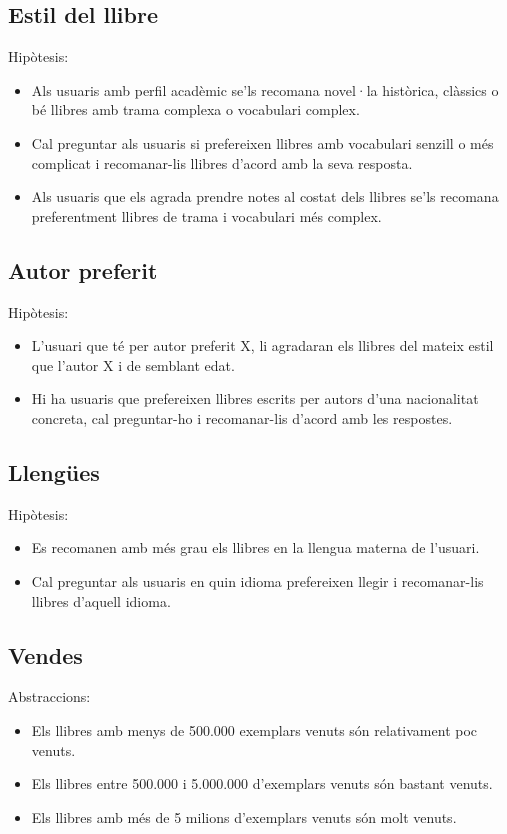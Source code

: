 \subsection{Estil del llibre}
Hipòtesis:
\begin{itemize}
  \item Als usuaris amb perfil acadèmic se'ls recomana novel·la històrica, clàssics o bé llibres amb trama complexa o vocabulari complex.
  \item Cal preguntar als usuaris si prefereixen llibres amb vocabulari senzill o més complicat i recomanar-lis llibres d'acord amb la seva resposta.
  \item Als usuaris que els agrada prendre notes al costat dels llibres se'ls recomana preferentment llibres de trama i vocabulari més complex.
\end{itemize}

\subsection{Autor preferit}
Hipòtesis:
\begin{itemize}
  \item L'usuari que té per autor preferit X, li agradaran els llibres del mateix estil que l'autor X i de semblant edat.
  \item Hi ha usuaris que prefereixen llibres escrits per autors d'una nacionalitat concreta, cal preguntar-ho i recomanar-lis d'acord amb les respostes.
\end{itemize}

\subsection{Llengües}
Hipòtesis:
\begin{itemize}
  \item Es recomanen amb més grau els llibres en la llengua materna de l'usuari.
  \item Cal preguntar als usuaris en quin idioma prefereixen llegir i recomanar-lis llibres d'aquell idioma.
\end{itemize}

\subsection{Vendes}
Abstraccions:
\begin{itemize}
  \item Els llibres amb menys de 500.000 exemplars venuts són relativament poc venuts.
  \item Els llibres entre 500.000 i 5.000.000 d'exemplars venuts són bastant venuts.
  \item Els llibres amb més de 5 milions d'exemplars venuts són molt venuts.
\end{itemize}


